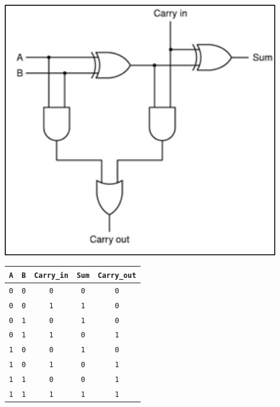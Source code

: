 \documentclass[12pt,a4paper]{article}
\begin{document}
\vspace{12pt}

\noindent %
\begin{minipage}{0.45\textwidth}
    \centering
    \includegraphics[width=0.9\textwidth]{./figs/FullAdder.png}
    \label{fig:somadorCompleto}
\end{minipage}\hfill %
\begin{minipage}{0.45\textwidth}
    \centering
    \begin{tabular}{ccc|cc}
    \hline
    \texttt{A} & \texttt{B} & \texttt{Carry\_in} & \texttt{Sum} & \texttt{Carry\_out} \\ \hline
    \texttt{0} & \texttt{0} & \texttt{0} & \texttt{0} & \texttt{0} \\
    \texttt{0} & \texttt{0} & \texttt{1} & \texttt{1} & \texttt{0} \\
    \texttt{0} & \texttt{1} & \texttt{0} & \texttt{1} & \texttt{0} \\
    \texttt{0} & \texttt{1} & \texttt{1} & \texttt{0} & \texttt{1} \\
    \texttt{1} & \texttt{0} & \texttt{0} & \texttt{1} & \texttt{0} \\
    \texttt{1} & \texttt{0} & \texttt{1} & \texttt{0} & \texttt{1} \\
    \texttt{1} & \texttt{1} & \texttt{0} & \texttt{0} & \texttt{1} \\
    \texttt{1} & \texttt{1} & \texttt{1} & \texttt{1} & \texttt{1} \\ \hline
    \end{tabular}
    \label{table:full_adder_truth_table}
\end{minipage}
\end{document}
